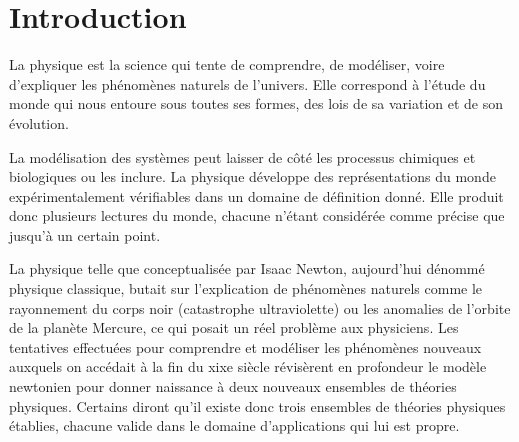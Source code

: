 \documentclass{udes_rapport} %
\begin{document}




\fairePageTitre
\newpage

\tableofcontents
\newpage


\listoffigures
\newpage



\section{Introduction}

La physique est la science qui tente de comprendre, de modéliser, voire d'expliquer les phénomènes naturels de l'univers. Elle correspond à l'étude du monde qui nous entoure sous toutes ses formes, des lois de sa variation et de son évolution.

La modélisation des systèmes peut laisser de côté les processus chimiques et biologiques ou les inclure. La physique développe des représentations du monde expérimentalement vérifiables dans un domaine de définition donné. Elle produit donc plusieurs lectures du monde, chacune n'étant considérée comme précise que jusqu'à un certain point.

La physique telle que conceptualisée par Isaac Newton, aujourd’hui dénommé physique classique, butait sur l'explication de phénomènes naturels comme le rayonnement du corps noir (catastrophe ultraviolette) ou les anomalies de l’orbite de la planète Mercure, ce qui posait un réel problème aux physiciens. Les tentatives effectuées pour comprendre et modéliser les phénomènes nouveaux auxquels on accédait à la fin du xixe siècle révisèrent en profondeur le modèle newtonien pour donner naissance à deux nouveaux ensembles de théories physiques. Certains diront qu'il existe donc trois ensembles de théories physiques établies, chacune valide dans le domaine d’applications qui lui est propre.
\end{document}
